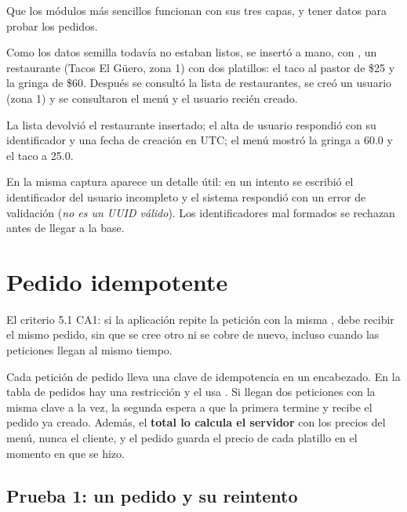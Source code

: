 \documentclass[11pt]{article}
\begin{document}
\queria Que los módulos más sencillos funcionan con sus tres capas, y tener datos para probar los pedidos.

Como los datos semilla todavía no estaban listos, se insertó a mano, con , un restaurante
(Tacos El Güero, zona 1) con dos platillos: el taco al pastor de \$25 y la gringa de \$60. Después
se consultó la lista de restaurantes, se creó un usuario (zona 1) y se consultaron el menú y el
usuario recién creado.

\observado La lista devolvió el restaurante insertado; el alta de usuario respondió con su
identificador y una fecha de creación en UTC; el menú mostró la gringa a 60.0 y el taco a 25.0.

En la misma captura aparece un detalle útil: en un intento se escribió el identificador del usuario
incompleto y el sistema respondió con un error de validación (\emph{no es un UUID válido}). Los
identificadores mal formados se rechazan antes de llegar a la base.


\section{Pedido idempotente}\label{sec:idem}

\queria El criterio 5.1 CA1: si la aplicación repite la petición con la misma
, debe recibir el mismo pedido, sin que se cree otro ni se cobre de nuevo,
incluso cuando las peticiones llegan al mismo tiempo.

\comofunciona Cada petición de pedido lleva una clave de idempotencia en un encabezado. En la tabla de
pedidos hay una restricción  y el  usa
. Si llegan dos peticiones con la misma clave a la vez, la segunda espera a
que la primera termine y recibe el pedido ya creado. Además, el \textbf{total lo calcula el servidor}
con los precios del menú, nunca el cliente, y el pedido guarda el precio de cada platillo en el
momento en que se hizo.

\subsection{Prueba 1: un pedido y su reintento}

\end{document}
